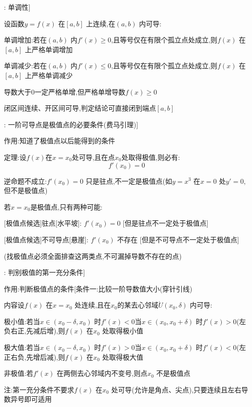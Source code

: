 \documentclass[11pt,a4paper,UTF8]{ctexart}
\begin{document}
\begin{thmbox}[原理[1]: 单调性]

设函数$y = f(x)$ 在$[a, b]$ 上连续,在$(a, b)$ 内可导:

单调增加:若在$(a, b)$ 内$f'(x) \ge 0$,且等号仅在有限个孤立点处成立,则$f(x)$ 在$[a, b]$ 上严格单调增加

单调减少:若在$(a, b)$ 内$f'(x) \le 0$,且等号仅在有限个孤立点处成立,则$f(x)$ 在$[a, b]$ 上严格单调减少

  导数大于0一定严格单增,但严格单增导数$f(x)\geq 0$

  闭区间连续、开区间可导,判定结论可直接闭到端点$[a, b]$

\end{thmbox}
\begin{thmbox}[原理[2]: 一阶可导点是极值点的必要条件(费马引理)]

作用:知道了极值点以后能得到的条件

定理:设$f(x)$在$x = x_0$处可导,且在点$x_0$处取得极值,则必有:
\begin{equation*}
f'(x_0) = 0
\end{equation*}


  逆命题不成立:$f'(x_0) = 0$ 只是驻点,不一定是极值点(如$y = x^3$ 在$x=0$ 处$y'=0$,但不是极值点)

若$x = x_0$是极值点,只有两种可能:

  [极值点候选]驻点[水平坡]:	  $f'(x_0) = 0$	[但是驻点不一定处于极值点]

  [极值点候选]不可导点[悬崖]:	$f'(x_0)$ 不存在  [但是不可导点不一定处于极值点]

  (找极值点必须全面排查这两类点,不可漏掉导数不存在的点)

\end{thmbox}
\begin{thmbox}[原理[3]: 判别极值的第一充分条件]

作用:判断极值点的条件[条件一:比较一阶导数值大小(穿针引线)

内容设$f(x)$ 在$x = x_0$ 处连续,且在$x_0$的某去心邻域$\mathring{U}(x_0, \delta)$ 内可导:

  极小值:若当$x \in (x_0 - \delta, x_0)$ 时$f'(x) < 0$当$x \in (x_0, x_0 + \delta)$ 时$f'(x) > 0$(左负右正,先减后增),则$f(x)$ 在$x_0$ 处取得极小值

  极大值:若当$x \in (x_0 - \delta, x_0)$ 时$f'(x) > 0$当$x \in (x_0, x_0 + \delta)$ 时$f'(x) < 0$(左正右负,先增后减),则$f(x)$ 在$x_0$ 处取得极大值

  非极值:若$f'(x)$ 在两侧去心邻域内不变号,则点$x_0$ 不是极值点

  注:第一充分条件不要求$f(x)$ 在$x_0$ 处可导(允许是角点、尖点),只要连续且左右导数异号即可适用

\end{thmbox}
\end{document}
